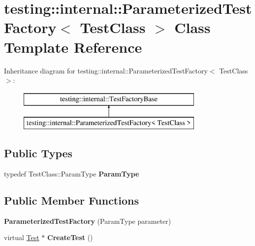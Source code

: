 \hypertarget{classtesting_1_1internal_1_1_parameterized_test_factory}{}\section{testing\+:\+:internal\+:\+:Parameterized\+Test\+Factory$<$ Test\+Class $>$ Class Template Reference}
\label{classtesting_1_1internal_1_1_parameterized_test_factory}
Inheritance diagram for testing\+:\+:internal\+:\+:Parameterized\+Test\+Factory$<$ Test\+Class $>$\+:\begin{figure}[H]
\begin{center}
\leavevmode
\includegraphics[height=2.000000cm]{classtesting_1_1internal_1_1_parameterized_test_factory}
\end{center}
\end{figure}
\subsection*{Public Types}
\begin{DoxyCompactItemize}
\item 
\mbox{\label{classtesting_1_1internal_1_1_parameterized_test_factory_ad9a27b8e1a83de2f1687625bccff460d}} 
typedef Test\+Class\+::\+Param\+Type {\bfseries Param\+Type}
\end{DoxyCompactItemize}
\subsection*{Public Member Functions}
\begin{DoxyCompactItemize}
\item 
\mbox{\label{classtesting_1_1internal_1_1_parameterized_test_factory_a82d78356cd402224255edec760a048fb}} 
{\bfseries Parameterized\+Test\+Factory} (Param\+Type parameter)
\item 
\mbox{\label{classtesting_1_1internal_1_1_parameterized_test_factory_ae17e73e91f7fd5d49ca238c005ef4960}} 
virtual \mbox{\hyperlink{classtesting_1_1_test}{Test}} $\ast$ {\bfseries Create\+Test} ()
\end{DoxyCompactItemize}
